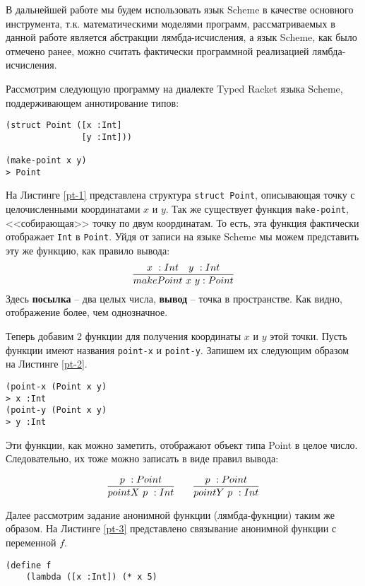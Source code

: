 \documentclass[a4paper,14pt]{extreport} %
\begin{document}
В дальнейшей работе мы будем использовать язык Scheme в качестве основного инструмента, т.к. математическими моделями программ, рассматриваемых в данной работе является абстракции лямбда-исчисления, а язык Scheme, как было отмечено ранее, можно считать фактически программной реализацией лямбда-исчисления.

Рассмотрим следующую программу на диалекте Typed Racket языка Scheme, поддерживающем аннотирование типов:

\begin{lstlisting}[caption={Конструирование объекта Point}, label={pt-1}]
(struct Point ([x :Int]
               [y :Int]))

(make-point x y)
> Point
\end{lstlisting}

На Листинге \ref{pt-1} представлена структура \texttt{struct Point}, описывающая точку с целочисленными координатами $x$ и $y$. Так же существует функция \texttt{make-point}, <<собирающая>> точку по двум координатам. То есть, эта функция фактически отображает \texttt{Int} в \texttt{Point}. Уйдя от записи на языке Scheme мы можем представить эту же функцию, как правило вывода:
$$
\infer{makePoint \ x \ y :Point}{%
    x \ :Int & y \ :Int
}
$$
Здесь \textbf{посылка} -- два целых числа, \textbf{вывод} -- точка в пространстве. Как видно, отображение более, чем однозначное.

Теперь добавим 2 функции для получения координаты $x$ и $y$ этой точки. Пусть функции имеют названия \texttt{point-x} и \texttt{point-y}. Запишем их следующим образом на Листинге \ref{pt-2}.

\begin{lstlisting}[caption={Получение координат точки}, label={pt-2}]
(point-x (Point x y)
> x :Int
(point-y (Point x y)
> y :Int
\end{lstlisting}

Эти функции, как можно заметить, отображают объект типа Point в целое число. Следовательно, их тоже можно записать в виде правил вывода:

\begin{equation*}
\infer{pointX \ p \ :Int}{%
    p \ :Point
}
\qquad  %
\infer{pointY \ p \ :Int}{%
    p \ :Point
}
\end{equation*}

Далее рассмотрим задание анонимной функции (лямбда-фукнции) таким же образом. На Листинге \ref{pt-3} представлено связывание анонимной функции с переменной $f$.
\begin{lstlisting}[caption={Задание фукнции}, label={pt-3}]
(define f
    (lambda ([x :Int]) (* x 5)
\end{lstlisting}
\end{document}
